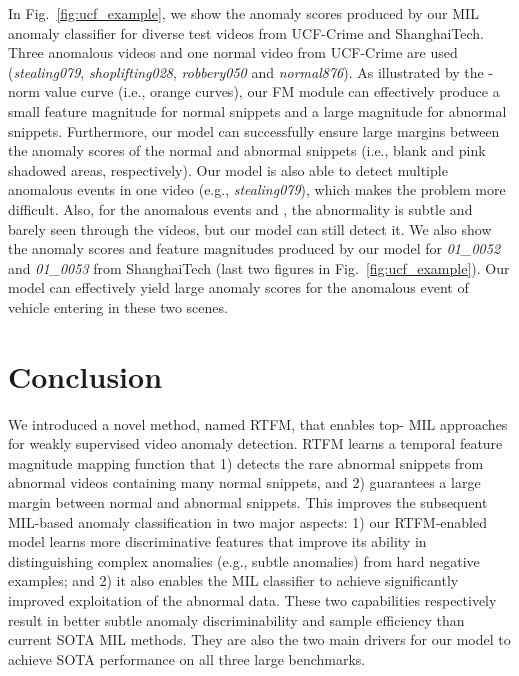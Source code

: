 \documentclass[10pt,twocolumn,letterpaper]{article}
\begin{document}
In Fig.~\ref{fig:ucf_example}, we show the anomaly scores produced by our MIL anomaly classifier for diverse test videos from UCF-Crime and ShanghaiTech. Three anomalous videos and one normal video from UCF-Crime are used (\textit{stealing079}, \textit{shoplifting028}, \textit{robbery050} and \textit{normal876}).  
As illustrated by the -norm value curve (i.e., orange curves), our FM module can effectively produce a small feature magnitude for normal snippets and a large magnitude for abnormal snippets. Furthermore, our model can successfully ensure large margins between the anomaly scores of the normal and abnormal snippets (i.e., blank and pink shadowed areas, respectively). Our model is also able to detect multiple anomalous events in one video (e.g., \textit{stealing079}), which makes the problem more difficult. Also, for the anomalous events   and , the abnormality is subtle and barely seen through the videos, but our model can still detect it. 
We also show the anomaly scores and feature magnitudes produced by our model for \textit{01\_0052} and \textit{01\_0053} from ShanghaiTech (last two figures in Fig.~\ref{fig:ucf_example}). Our model can effectively yield large anomaly scores for the anomalous event of vehicle entering in these two scenes.  



























\section{Conclusion}

We introduced a novel method, named RTFM, that enables top- MIL approaches for weakly supervised video anomaly detection. RTFM learns a temporal feature magnitude mapping function that 1) detects the rare abnormal snippets from abnormal videos containing many normal snippets, and 2) guarantees a large margin between normal and abnormal snippets. This improves the subsequent MIL-based anomaly classification in two major aspects: 1) our RTFM-enabled model learns more discriminative features that improve its ability in distinguishing complex anomalies (e.g., subtle anomalies) from hard negative examples; and 2) it also enables the MIL classifier to achieve significantly improved exploitation of the abnormal data. These two capabilities respectively result in better subtle anomaly discriminability and sample efficiency than current SOTA MIL methods. They are also the two main drivers for our model to achieve SOTA performance on all three large benchmarks.
\end{document}
